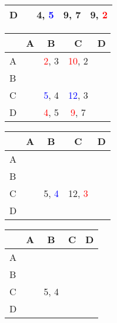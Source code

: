 \documentclass[12pt]{report}
\begin{document}
\begin{flushleft}
\begin{figure}[!htb]
\begin{minipage}{0.45\textwidth}
\begin{tabular}{p{0.3cm}|c|c|c|c|}
            \hline
            D & & 4, \textcolor{blue}{5} & 9, 7 & 9, \textcolor{red}{2} \\
            \hline
        \end{tabular}
    \end{minipage}
    \begin{minipage}{0.45\textwidth}
        \centering
        \begin{tabular}{p{0.3cm}|c|c|c|c|}
            & A & B & C & D \\
            \hline
            A & & \textcolor{red}{2}, 3 & \textcolor{red}{10}, 2 & \\
            \hline
            B & & & & \\
            \hline
            C & & \textcolor{blue}{5}, 4 & \textcolor{blue}{12}, 3 & \\
            \hline
            D & & \textcolor{red}{4}, 5 & \textcolor{red}{9}, 7 & \\
            \hline
        \end{tabular}
    \end{minipage}
\end{figure}
\begin{figure}[!htb]
    \begin{minipage}{0.45\textwidth}
        \centering
        \begin{tabular}{p{0.3cm}|c|c|c|c|}
            & A & B & C & D \\
            \hline
            A & & & & \\
            \hline
            B & & & & \\
            \hline
            C & & 5, \textcolor{blue}{4} & 12, \textcolor{red}{3} & \\
            \hline
            D & & & & \\
            \hline
        \end{tabular}
    \end{minipage}
    \begin{minipage}{0.45\textwidth}
        \centering
        \begin{tabular}{p{0.3cm}|c|c|c|c|}
            & A & B & C & D \\
            \hline
            A & & & & \\
            \hline
            B & & & & \\
            \hline
            C & & 5, 4 & & \\
            \hline
            D & & & & \\
            \hline
        \end{tabular}
    \end{minipage}
\end{figure}


\end{flushleft}
\end{document}
